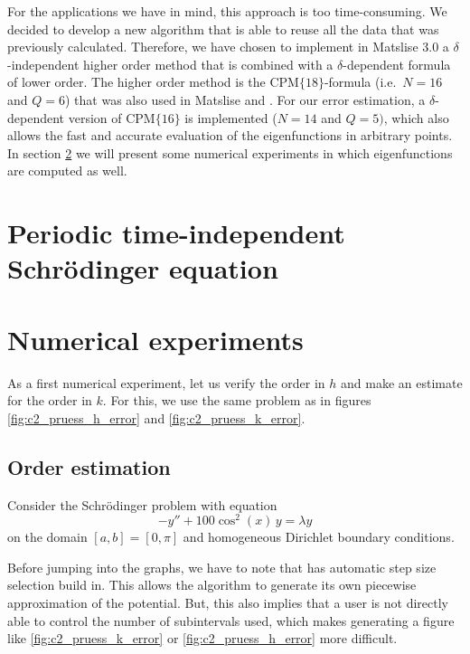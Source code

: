 For the applications we have in mind, this approach is too time-consuming. We decided to develop a new algorithm that is able to reuse all the data that was previously calculated. Therefore, we have chosen to implement in Matslise 3.0 a $\delta$-independent higher order method that is combined with a $\delta$-dependent formula of lower order. The higher order method is the $\text{CPM}\{18\}$-formula (i.e.\ $N=16$ and $Q=6$) that was also used in Matslise and . For our error estimation, a $\delta$-dependent version of $\text{CPM}\{16\}$ is implemented ($N=14$ and $Q=5)$, which also allows the fast and accurate evaluation of the eigenfunctions in arbitrary points. In section \ref{sec:c2_numerical_experiments} we will present some numerical experiments in which eigenfunctions are computed as well.

\section{Periodic \texorpdfstring{\oneD}{1D} time-independent Schrödinger equation}\label{sec:1d_periodic}

\begin{theorem}

\end{theorem}
\cite{binding_prufer_2012}


\section{Numerical experiments}\label{sec:c2_numerical_experiments}

As a first numerical experiment, let us verify the order in $h$ and make an estimate for the order in $k$. For this, we use the same problem as in figures \ref{fig:c2_pruess_h_error} and \ref{fig:c2_pruess_k_error}.

\subsection{Order estimation}

Consider the Schrödinger problem with equation
\begin{equation}\label{equ:c2_matslise_order_test_problem}
    -y'' + 100\cos^2(x)\,y = \lambda y
\end{equation}
on the domain $[a, b] = [0, \pi]$ and homogeneous Dirichlet boundary conditions.

Before jumping into the graphs, we have to note that  has automatic step size selection build in. This allows the algorithm to generate its own piecewise approximation of the potential. But, this also implies that a user is not directly able to control the number of subintervals used, which makes generating a figure like \ref{fig:c2_pruess_k_error} or \ref{fig:c2_pruess_h_error} more difficult.

